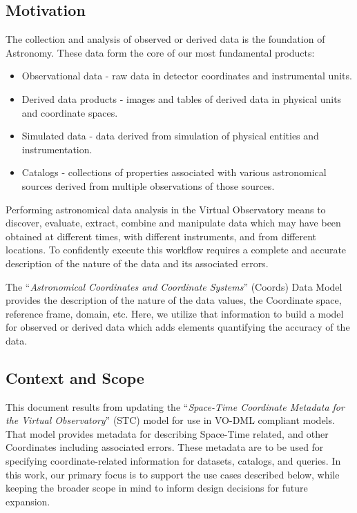\documentclass[11pt,a4paper]{ivoa}
\begin{document}
\subsection{Motivation}
The collection and analysis of observed or derived data is the foundation of Astronomy.  
These data form the core of our most fundamental products:
\begin{itemize}
  \item Observational data - raw data in detector coordinates and instrumental units.
  \item Derived data products - images and tables of derived data in physical units and coordinate spaces.
  \item Simulated data - data derived from simulation of physical entities and instrumentation.
  \item Catalogs - collections of properties associated with various astronomical sources derived from multiple observations of those sources.
\end{itemize}

Performing astronomical data analysis in the Virtual Observatory means to discover, evaluate, 
extract, combine and manipulate data which may have been obtained at different times, 
with different instruments, and from different locations.  To confidently execute this workflow 
requires a complete and accurate description of the nature of the data and its associated errors.  

The ``\emph{Astronomical Coordinates and Coordinate Systems}'' (Coords) \citep{std:Coords} Data Model provides the description of the nature of the data values, the Coordinate space, reference frame, domain, etc.  Here, we utilize that information to build a model for observed or derived data which adds elements quantifying the accuracy of the data.

\subsection{Context and Scope}

This document results from updating the ``\emph{Space-Time Coordinate Metadata for the Virtual Observatory}'' (STC) \citep{2007ivoa.spec.1030R} model for use in VO-DML compliant models.  That model provides metadata for describing Space-Time related, and other Coordinates including associated errors.  These metadata are to be used for specifying coordinate-related information for datasets, catalogs, and queries.  In this work, our primary focus is to support the use cases described below, while keeping the broader scope in mind to inform design decisions for future expansion.
\end{document}
